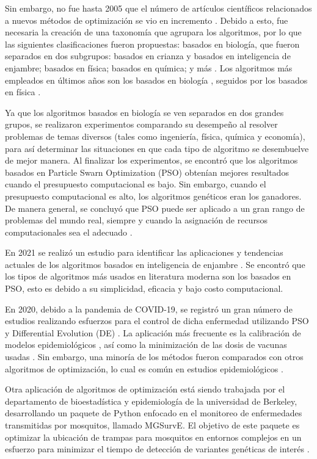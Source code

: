 \documentclass[letterpaper, 10pt, conference]{ieeeconf}
\begin{document}
Sin embargo, no fue hasta 2005 que el número de artículos científicos relacionados a nuevos métodos de optimización se vio en incremento \cite{Taxonomies}. Debido a esto, fue necesaria la creación de una taxonomía que agrupara los algoritmos, por lo que las siguientes clasificaciones fueron propuestas: basados en biología, que fueron separados en dos subgrupos: basados en crianza y basados en inteligencia de enjambre; basados en física; basados en química; y más \cite{Taxonomies}. Los algoritmos más empleados en últimos años son los basados en biología \cite{Taxonomies}, seguidos por los basados en física \cite{PhysicsBasedRev}.

Ya que los algoritmos basados en biología se ven separados en dos grandes grupos, se realizaron experimentos comparando su desempeño al resolver problemas de temas diversos (tales como ingeniería, física, química y economía), para así determinar las situaciones en que cada tipo de algoritmo se desembuelve de mejor manera. Al finalizar los experimentos, se encontró que los algoritmos basados en Particle Swarn Optimization (PSO) obtenían mejores resultados cuando el presupuesto computacional es bajo. Sin embargo, cuando el presupuesto computacional es alto, los algoritmos genéticos eran los ganadores. De manera general, se concluyó que PSO puede ser aplicado a un gran rango de problemas del mundo real, siempre y cuando la asignación de recursos computacionales sea el adecuado \cite{SwarmVsEvol}.

En 2021 se realizó un estudio para identificar las aplicaciones y tendencias actuales de los algoritmos basados en inteligencia de enjambre \cite{SwarmIntRev}. Se encontró que los tipos de algoritmos más usados en literatura moderna son los basados en PSO, esto es debido a su simplicidad, eficacia y bajo costo computacional.

En  2020, debido a la pandemia de COVID-19, se registró un gran número de estudios realizando esfuerzos para el control de dicha enfermedad utilizando PSO y Differential Evolution (DE) \cite{DE&PSOCov}. La aplicación más frecuente es la calibración de modelos epidemiológicos \cite{DE&PSOCov}, así como la minimización de las dosis de vacunas usadas \cite{COVVacc}. Sin embargo, una minoría de los métodos fueron comparados con otros algoritmos de optimización, lo cual es común en estudios epidemiológicos \cite{DE&PSOCov}.

Otra aplicación de algoritmos de optimización está siendo trabajada por el departamento de bioestadística y epidemiología de la universidad de Berkeley, desarrollando un paquete de Python enfocado en el monitoreo de enfermedades transmitidas por mosquitos, llamado MGSurvE. El objetivo de este paquete es optimizar la ubicación de trampas para mosquitos en entornos complejos en un esfuerzo para minimizar el tiempo de detección de variantes genéticas de interés \cite{MGSurvEPyPi}.
\end{document}
